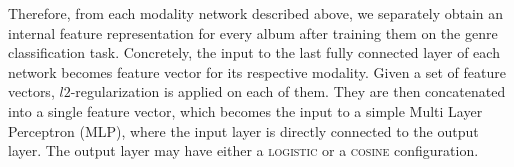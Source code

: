 Therefore, from each modality network described above, we separately obtain an internal feature representation for every album after training them on the genre classification task.
Concretely, the input to the last fully connected layer of each network becomes feature vector for its respective modality.
Given a set of feature vectors, $l2$-regularization is applied on each of them. 
They are then concatenated into a single feature vector, which becomes the input to a simple Multi Layer Perceptron (MLP), where the input layer is directly connected to the output layer. 
The output layer may have either a \textsc{logistic} or a \textsc{cosine} configuration. %

